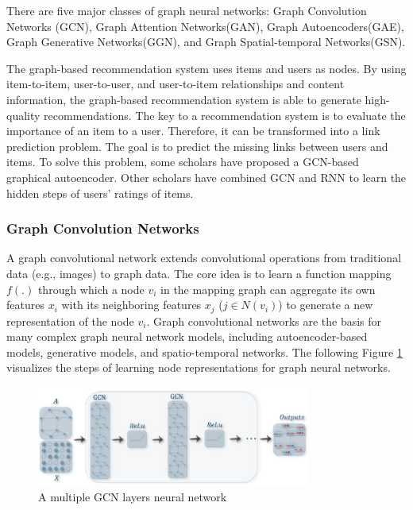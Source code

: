 \documentclass[11pt,en]{elegantpaper}
\begin{document}
There are five major classes of graph neural networks: Graph Convolution Networks (GCN), Graph Attention Networks(GAN), Graph Autoencoders(GAE), Graph Generative Networks(GGN), and Graph Spatial-temporal Networks(GSN).

The graph-based recommendation system uses items and users as nodes. By using item-to-item, user-to-user, and user-to-item relationships and content information, the graph-based recommendation system is able to generate high-quality recommendations. The key to a recommendation system is to evaluate the importance of an item to a user. Therefore, it can be transformed into a link prediction problem. The goal is to predict the missing links between users and items. To solve this problem, some scholars have proposed a GCN-based graphical autoencoder. Other scholars have combined GCN and RNN to learn the hidden steps of users' ratings of items.



\subsubsection{Graph Convolution Networks}
A graph convolutional network extends convolutional operations from traditional data (e.g., images) to graph data. The core idea is to learn a function mapping $f(.)$ through which a node $v_i$ in the mapping graph can aggregate its own features $x_i$ with its neighboring features $x_j$ ($j\in N(v_i)$) to generate a new representation of the node $v_i$. Graph convolutional networks are the basis for many complex graph neural network models, including autoencoder-based models, generative models, and spatio-temporal networks. The following Figure \ref{gcn1} visualizes the steps of learning node representations for graph neural networks.

\begin{figure}[h]
	\centering
	\includegraphics[width=0.8\textwidth]{./image/gcn1.png}
	\caption{A multiple GCN layers neural network}
	\label{gcn1}
\end{figure}
\end{document}
